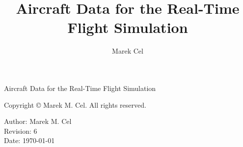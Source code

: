 \documentclass[12pt,a4paper]{report}
\title{Aircraft Data for the Real-Time Flight Simulation}
\author{Marek Cel}
\date{}
\begin{document}
  
  \begin{titlepage}
    \centering
    {\huge Aircraft Data for the Real-Time Flight Simulation\par}
  \end{titlepage}
  

  \noindent Copyright \copyright{} \the\year{} Marek M. Cel. All rights reserved.

  \noindent Author: Marek M. Cel \\
  Revision: 6 \\
  Date: \today

  
  
  {
    \clearpage
    \setlength{\parskip}{0em}
    \tableofcontents
  }

  
  
  
  
  
  
  
  \clearpage
   
  
  
\end{document}
